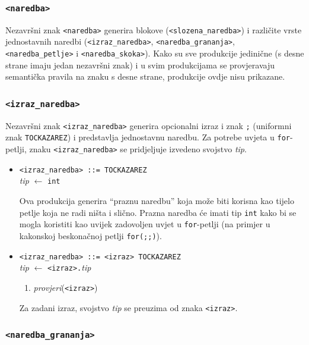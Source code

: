 \documentclass[times, 12pt, utf8]{book}
\begin{document}
\subsubsection{\texttt{<naredba>}}

Nezavršni znak \verb|<naredba>| generira blokove (\verb|<slozena_naredba>|) i različite vrste jednostavnih naredbi (\verb|<izraz_naredba>|, \verb|<naredba_grananja>|, \verb|<naredba_petlje>| i \verb|<naredba_skoka>|).
Kako su sve produkcije jedinične (s desne strane imaju jedan nezavršni znak) i u svim produkcijama se provjeravaju semantička pravila na znaku s desne strane, produkcije ovdje nisu prikazane.

\subsubsection{\texttt{<izraz\_naredba>}}

Nezavršni znak \verb|<izraz_naredba>| generira opcionalni izraz i znak \verb|;| (uniformni znak \verb|TOCKAZAREZ|) i predstavlja jednostavnu naredbu.
Za potrebe uvjeta u \verb|for|-petlji, znaku \verb|<izraz_naredba>| se pridjeljuje izvedeno svojstvo \emph{tip}.

\begin{itemize}

\item
\verb|<izraz_naredba> ::= TOCKAZAREZ|\\
\emph{tip} \(\leftarrow\) \verb|int|

Ova produkcija generira ``praznu naredbu'' koja može biti korisna kao tijelo petlje koja ne radi ništa i slično.
Prazna naredba će imati tip \verb|int| kako bi se mogla koristiti kao uvijek zadovoljen uvjet u \verb|for|-petlji (na primjer u kakonskoj beskonačnoj petlji \verb|for(;;)|).

\item
\verb|<izraz_naredba> ::= <izraz> TOCKAZAREZ|\\
\emph{tip} \(\leftarrow\) \verb|<izraz>.|\emph{tip}
\begin{enumerate}
\item
\emph{provjeri}(\verb|<izraz>|)
\end{enumerate}

Za zadani izraz, svojstvo \emph{tip} se preuzima od znaka \verb|<izraz>|.

\end{itemize}

\subsubsection{\texttt{<naredba\_grananja>}}
\end{document}
